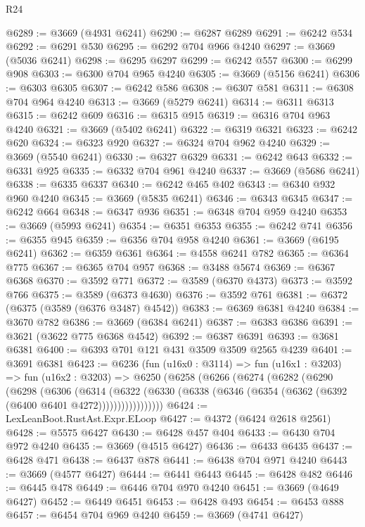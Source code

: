 \begin{lexlean}{R24}
\begin{coremodule}
@6289 := @3669 (@4931 @6241)
@6290 := @6287 @6289
@6291 := @6242 @534
@6292 := @6291 @530
@6295 := @6292 @704 @966 @4240
@6297 := @3669 (@5036 @6241)
@6298 := @6295 @6297
@6299 := @6242 @557
@6300 := @6299 @908
@6303 := @6300 @704 @965 @4240
@6305 := @3669 (@5156 @6241)
@6306 := @6303 @6305
@6307 := @6242 @586
@6308 := @6307 @581
@6311 := @6308 @704 @964 @4240
@6313 := @3669 (@5279 @6241)
@6314 := @6311 @6313
@6315 := @6242 @609
@6316 := @6315 @915
@6319 := @6316 @704 @963 @4240
@6321 := @3669 (@5402 @6241)
@6322 := @6319 @6321
@6323 := @6242 @620
@6324 := @6323 @920
@6327 := @6324 @704 @962 @4240
@6329 := @3669 (@5540 @6241)
@6330 := @6327 @6329
@6331 := @6242 @643
@6332 := @6331 @925
@6335 := @6332 @704 @961 @4240
@6337 := @3669 (@5686 @6241)
@6338 := @6335 @6337
@6340 := @6242 @465 @402
@6343 := @6340 @932 @960 @4240
@6345 := @3669 (@5835 @6241)
@6346 := @6343 @6345
@6347 := @6242 @664
@6348 := @6347 @936
@6351 := @6348 @704 @959 @4240
@6353 := @3669 (@5993 @6241)
@6354 := @6351 @6353
@6355 := @6242 @741
@6356 := @6355 @945
@6359 := @6356 @704 @958 @4240
@6361 := @3669 (@6195 @6241)
@6362 := @6359 @6361
@6364 := @4558 @6241 @782
@6365 := @6364 @775
@6367 := @6365 @704 @957
@6368 := @3488 @5674
@6369 := @6367 @6368
@6370 := @3592 @771
@6372 := @3589 (@6370 @4373)
@6373 := @3592 @766
@6375 := @3589 (@6373 @4630)
@6376 := @3592 @761
@6381 := @6372 (@6375 (@3589 (@6376 @3487) @4542))
@6383 := @6369 @6381 @4240
@6384 := @3670 @782
@6386 := @3669 (@6384 @6241)
@6387 := @6383 @6386
@6391 := @3621 (@3622 @775 @6368 @4542)
@6392 := @6387 @6391
@6393 := @3681 @6381
@6400 := @6393 @701 @121 @431 @3509 @3509 @2565 @4239
@6401 := @3691 @6381
@6423 := @6236
    (fun (u16x0 : @3114) =>
    fun (u16x1 : @3203) =>
    fun (u16x2 : @3203) =>
    @6250
      (@6258
        (@6266
          (@6274
            (@6282
              (@6290
                (@6298
                  (@6306
                    (@6314
                      (@6322
                        (@6330
                          (@6338 (@6346 (@6354 (@6362 (@6392 (@6400 @6401 @4272)))))))))))))))))
@6424 := LexLeanBoot.RustAst.Expr.ELoop
@6427 := @4372 (@6424 @2618 @2561)
@6428 := @5575 @6427
@6430 := @6428 @457 @404
@6433 := @6430 @704 @972 @4240
@6435 := @3669 (@4515 @6427)
@6436 := @6433 @6435
@6437 := @6428 @471
@6438 := @6437 @878
@6441 := @6438 @704 @971 @4240
@6443 := @3669 (@4577 @6427)
@6444 := @6441 @6443
@6445 := @6428 @482
@6446 := @6445 @478
@6449 := @6446 @704 @970 @4240
@6451 := @3669 (@4649 @6427)
@6452 := @6449 @6451
@6453 := @6428 @493
@6454 := @6453 @888
@6457 := @6454 @704 @969 @4240
@6459 := @3669 (@4741 @6427)

\end{coremodule}
\end{lexlean}
